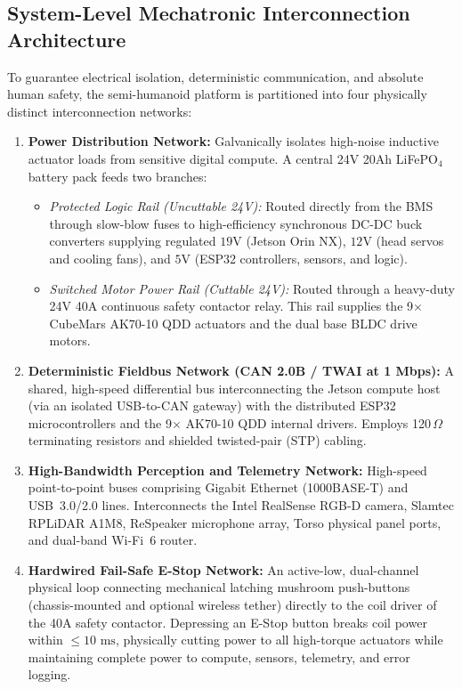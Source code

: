 \subsection{System-Level Mechatronic Interconnection Architecture}
\label{subsec:mechatronic_interconnection}
To guarantee electrical isolation, deterministic communication, and absolute human safety, the semi-humanoid platform is partitioned into four physically distinct interconnection networks:
\begin{enumerate}[leftmargin=1.5em]
  \item \textbf{Power Distribution Network:} Galvanically isolates high-noise inductive actuator loads from sensitive digital compute. A central 24V 20Ah LiFePO$_4$ battery pack feeds two branches:
  \begin{itemize}
    \item \emph{Protected Logic Rail (Uncuttable 24V):} Routed directly from the BMS through slow-blow fuses to high-efficiency synchronous DC-DC buck converters supplying regulated $19\text{V}$ (Jetson Orin NX), $12\text{V}$ (head servos and cooling fans), and $5\text{V}$ (ESP32 controllers, sensors, and logic).
    \item \emph{Switched Motor Power Rail (Cuttable 24V):} Routed through a heavy-duty 24V 40A continuous safety contactor relay. This rail supplies the 9$\times$ CubeMars AK70-10 QDD actuators and the dual base BLDC drive motors.
  \end{itemize}
  \item \textbf{Deterministic Fieldbus Network (CAN 2.0B / TWAI at 1 Mbps):} A shared, high-speed differential bus interconnecting the Jetson compute host (via an isolated USB-to-CAN gateway) with the distributed ESP32 microcontrollers and the 9$\times$ AK70-10 QDD internal drivers. Employs 120\,$\Omega$ terminating resistors and shielded twisted-pair (STP) cabling.
  \item \textbf{High-Bandwidth Perception and Telemetry Network:} High-speed point-to-point buses comprising Gigabit Ethernet (1000BASE-T) and USB~3.0/2.0 lines. Interconnects the Intel RealSense RGB-D camera, Slamtec RPLiDAR A1M8, ReSpeaker microphone array, Torso physical panel ports, and dual-band Wi-Fi~6 router.
  \item \textbf{Hardwired Fail-Safe E-Stop Network:} An active-low, dual-channel physical loop connecting mechanical latching mushroom push-buttons (chassis-mounted and optional wireless tether) directly to the coil driver of the 40A safety contactor. Depressing an E-Stop button breaks coil power within $\le 10\text{ ms}$, physically cutting power to all high-torque actuators while maintaining complete power to compute, sensors, telemetry, and error logging.
\end{enumerate}

